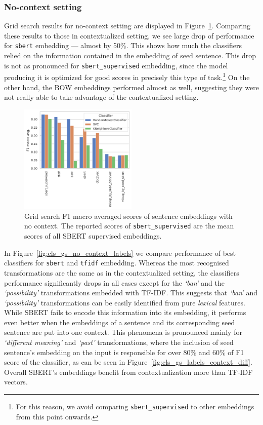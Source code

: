 \documentclass[11pt]{article}
\newcommand{\Embed}[1]{\texttt{#1}}
\newcommand{\Trans}[1]{\textsl{`#1'}}
\begin{document}
\subsubsection{No-context setting}

Grid search results for no-context setting are displayed in
Figure~\ref{fig:cls_gs_no_context_embed_comparison}. Comparing these results to
those in contextualized setting, we see large drop of performance for
\Embed{sbert} embedding --- almost by 50\%. This shows how much the classifiers
relied on the information contained in the embedding of seed sentence. This
drop is not as pronounced for \Embed{sbert\_supervised} embedding, since the
model producing it is optimized for good scores in precisely this type of
task.\footnote{For this reason, we avoid comparing \Embed{sbert\_supervised} to
other embeddings from this point onwards.} On the other hand, the BOW
embeddings performed almost as well, suggesting they were not really able to
take advantage of the contextualized setting.

\begin{figure}[htp]
  \centering
  \includegraphics[width=0.5\textwidth]{./figs/cls_gs_no_context_embed_comparison.png}

  \caption{Grid search F1 macro averaged scores of sentence embeddings with no
  context. The reported scores of \Embed{sbert\_supervised} are the mean scores
  of all SBERT supervised
  embeddings.}\label{fig:cls_gs_no_context_embed_comparison}

\end{figure}

In Figure~\ref{fig:cls_gs_no_context_labels} we compare performance of best
classifiers for \Embed{sbert} and \Embed{tfidf} embedding. Whereas the most
recognised transformations are the same as in the contextualized setting, the
classifiers performance significantly drops in all cases except for the
\Trans{ban} and the \Trans{possibility} transformations embedded with TF-IDF.
This suggests that \Trans{ban} and \Trans{possibility} transformations can be
easily identified from pure \emph{lexical} features. While SBERT fails to
encode this information into its embedding, it performs even better when the
embeddings of a sentence and its corresponding seed sentence are put into one
context. This phenomena is pronounced mainly for \Trans{different meaning} and
\Trans{past} transformations, where the inclusion of seed sentence's embedding
on the input is responsible for over 80\% and 60\% of F1 score of the
classifier, as can be seen in Figure~\ref{fig:cls_gs_labels_context_diff}.
Overall SBERT's embeddings benefit from contextualization more than TF-IDF
vectors.
\end{document}
